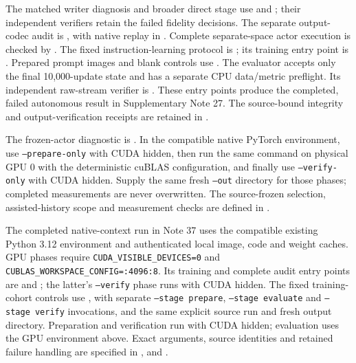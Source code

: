 \documentclass[10pt,a4paper]{article}
\begin{document}
The matched writer diagnosis and broader direct stage use
 and
; their independent
verifiers retain the failed fidelity decisions. The separate output-codec
audit is , with native replay in
. Complete separate-space actor
execution is checked by .
The fixed instruction-learning protocol is
; its training entry
point is . Prepared prompt images
and blank controls use .
The evaluator  accepts only the final
10,000-update state and has a separate CPU data/metric preflight. Its
independent raw-stream verifier is .
These entry points produce the completed, failed autonomous result in
Supplementary Note 27. The source-bound integrity and output-verification
receipts are retained in .

The frozen-actor diagnostic is
. In the compatible native
PyTorch environment, use \texttt{--prepare-only} with CUDA hidden, then run
the same command on physical GPU 0 with the deterministic cuBLAS configuration,
and finally use \texttt{--verify-only} with CUDA hidden. Supply the same fresh
\texttt{--out} directory for those phases; completed measurements are never
overwritten. The source-frozen selection, assisted-history scope and
measurement checks are defined in
.

The completed native-context run in Note 37 uses the compatible existing
Python 3.12 environment and authenticated local image, code and weight caches.
GPU phases require \texttt{CUDA\_VISIBLE\_DEVICES=0} and
\texttt{CUBLAS\_WORKSPACE\_CONFIG=:4096:8}. Its training and complete audit
entry points are  and
; the latter's \texttt{--verify}
phase runs with CUDA hidden. The fixed training-cohort controls use
, with separate
\texttt{--stage prepare}, \texttt{--stage evaluate} and
\texttt{--stage verify} invocations, and the same explicit source run and
fresh output directory. Preparation and verification run with CUDA hidden;
evaluation uses the GPU environment above. Exact arguments, source identities
and retained failure handling are specified in
,
 and
.
\end{document}

